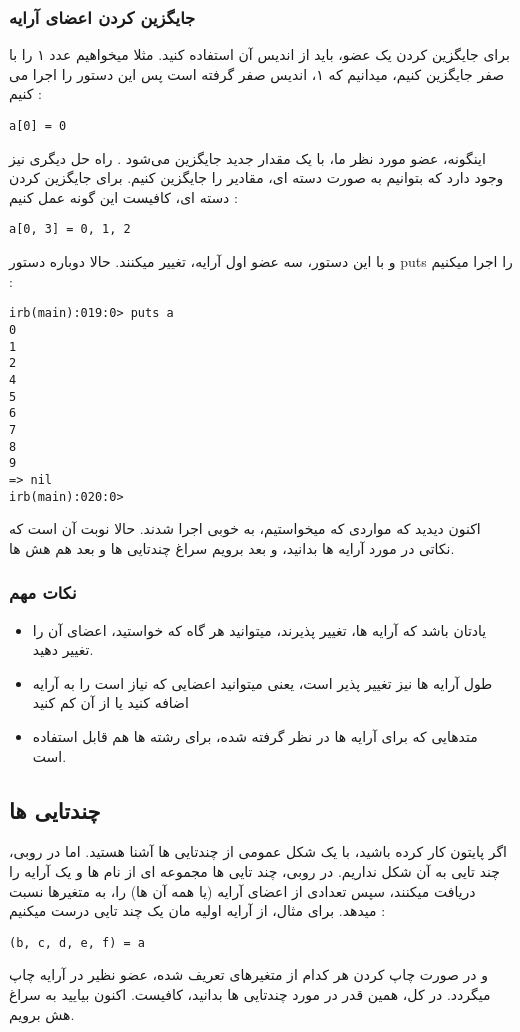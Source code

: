 \documentclass[11pt]{article}
\begin{document}
\subsubsection{جایگزین کردن اعضای آرایه}
برای جایگزین کردن یک عضو، باید از اندیس آن استفاده کنید. مثلا میخواهیم عدد ۱ را با صفر جایگزین کنیم، میدانیم که ۱، اندیس صفر گرفته است پس این دستور را اجرا می کنیم :
\begin{latin}
\begin{verbatim}
a[0] = 0
\end{verbatim}
\end{latin}
اینگونه، عضو مورد نظر ما، با یک مقدار جدید جایگزین می‌شود . راه حل دیگری نیز وجود دارد که بتوانیم به صورت دسته ای، مقادیر را جایگزین کنیم. برای جایگزین کردن دسته ای، کافیست این گونه عمل کنیم :
\begin{latin}
\begin{verbatim}
a[0, 3] = 0, 1, 2
\end{verbatim}
\end{latin}
و با این دستور، سه عضو اول آرایه، تغییر میکنند. حالا دوباره دستور puts را اجرا میکنیم : 
\begin{latin}
\begin{verbatim}
irb(main):019:0> puts a
0
1
2
4
5
6
7
8
9
=> nil
irb(main):020:0> 
\end{verbatim}
\end{latin}
اکنون دیدید که مواردی که میخواستیم، به خوبی اجرا شدند. حالا نوبت آن است که نکاتی در مورد آرایه ها بدانید، و بعد برویم سراغ چندتایی ها و بعد هم هش ها. 
\subsubsection{نکات مهم}
\begin{itemize}
\item یادتان باشد که آرایه ها، تغییر پذیرند، میتوانید هر گاه که خواستید، اعضای آن را تغییر دهید. 
\item طول آرایه ها نیز تغییر پذیر است، یعنی میتوانید اعضایی که نیاز است را به آرایه اضافه کنید یا از آن کم کنید
\item متدهایی که برای آرایه ها در نظر گرفته شده، برای رشته ها هم قابل استفاده است. 
\end{itemize}
\subsection{چندتایی ها}
اگر پایتون کار کرده باشید، با یک شکل عمومی از چندتایی ها آشنا هستید. اما در روبی، چند تایی به آن شکل نداریم. در روبی، چند تایی ها مجموعه ای از نام ها و یک آرایه را دریافت میکنند، سپس تعدادی از اعضای آرایه (یا همه آن ها) را، به متغیرها نسبت میدهد. برای مثال، از آرایه اولیه مان یک چند تایی درست میکنیم :
\begin{latin}
\begin{verbatim}
(b, c, d, e, f) = a
\end{verbatim}
\end{latin}
و در صورت چاپ کردن هر کدام از متغیرهای تعریف شده، عضو نظیر در آرایه چاپ میگردد. در کل، همین قدر در مورد چندتایی ها بدانید، کافیست. اکنون بیایید به سراغ هش برویم. 
\end{document}
